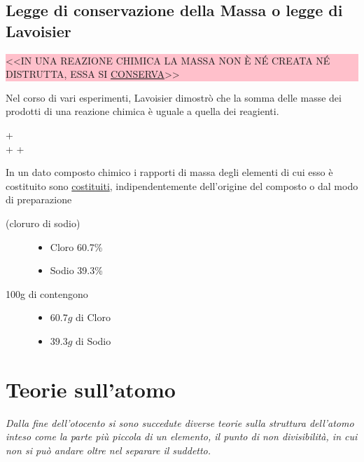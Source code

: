 \subsection{Legge di conservazione della Massa o legge di Lavoisier}
\label{sec:legdiconse}
\colorbox{pink}
{
\begin{minipage}{.97\textwidth}
    <<IN UNA REAZIONE CHIMICA LA MASSA NON È NÉ CREATA NÉ DISTRUTTA, ESSA SI \underline{CONSERVA}>>
\end{minipage}
}
\begin{nota}
  Nel corso di vari esperimenti, Lavoisier dimostrò che la somma delle masse dei prodotti di una reazione chimica è
  uguale a quella dei reagienti.
  \begin{center}
     \textrightarrow {}+\\
     +  \textrightarrow {}+
  \end{center}
\end{nota}
\begin{defi}
  In un dato composto chimico i rapporti di massa degli elementi di cui esso è costituito sono
  \underline{costituiti}, indipendentemente dell'origine del composto o dal modo di preparazione
\end{defi}
\begin{description}
\item[ (cloruro di sodio)]
  \begin{itemize}
  \item Cloro 60.7\%
  \item Sodio 39.3\%
  \end{itemize}
\item[100g di  contengono]
  \begin{itemize}
  \item $60.7g$ di Cloro
  \item $39.3g$ di Sodio
  \end{itemize}
\end{description}

\section{Teorie sull'atomo}
\label{sec:atomo}
\textit{Dalla fine dell'otocento si sono succedute diverse teorie sulla struttura dell'atomo inteso come
  la parte più piccola di un elemento, il punto di non divisibilità, in cui non si può andare oltre nel separare il
  suddetto.}

